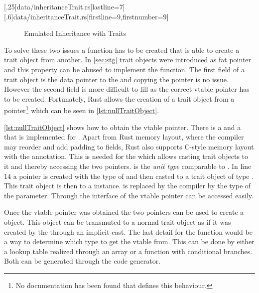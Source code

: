 \documentclass[thesis]{subfiles}
\begin{document}
    \LstTikzBox{\inheritanceTraitOne}[.25\linewidth]{data/inheritanceTrait.rs}[lastline=7]
    \LstTikzBox{\inheritanceTraitTwo}[.6\linewidth]{data/inheritanceTrait.rs}[firstline=9,firstnumber=9]
    \begin{figure}[ht]
      \captionsetup{type=lstlisting}
      \usebox{\inheritanceTraitOne}\hfill%
      \usebox{\inheritanceTraitTwo}
      \caption{Emulated Inheritance with Traits}\label{lst:inheritanceTrait}
    \end{figure}

    To solve these two issues a \cast function has to be created that is able to create a trait object from another.
    In \autoref{sec:stg} trait objects were introduced as fat pointer and this property can be abused to implement the \cast function.
    The first field of a trait object is the data pointer to the \struct and copying the pointer is no issue.
    However the second field is more difficult to fill as the correct vtable pointer has to be created.
    Fortunately, Rust allows the creation of a trait object from a  pointer\footnote{
      No documentation has been found that defines this behaviour.
    } which can be seen in \autoref{lst:nullTraitObject}.
    \autocite{rust-digg}


    \autoref{lst:nullTraitObject} shows how to obtain the vtable pointer.
    There is a  and a  that is implemented for .
    Apart from Rust memory layout, where the compiler may reorder and add padding to fields, Rust also supports C-style memory layout with the \codr{#[repr(C)]} annotation.
    This is needed for the \TraitObject \struct which allows casting trait objects to it and thereby accessing the two pointers.
    \codr{()} is the \emph{unit type} comparable to \autocites[repr(C)]{rust-nom}[Defining and Instantiating Structs]{rust-book}.
    In line 14 a  pointer is created with the type of  and then casted to a trait object of type .
    This trait object is then  to a \TraitObject instance.
    \codr{_} is replaced by the compiler by the type of the parameter.
    Through the interface of \TraitObject the vtable pointer can be accessed easily.

    Once the vtable pointer was obtained the two pointers can be used to create a \TraitObject object.
    This object can be transmuted to a normal trait object as if it was created by the \struct through an implicit cast.
    The last detail for the \cast function would be a way to determine which type to get the vtable from.
    This can be done by either a lookup table realized through an array or a function with conditional branches.
    Both can be generated through the code generator.
\end{document}
